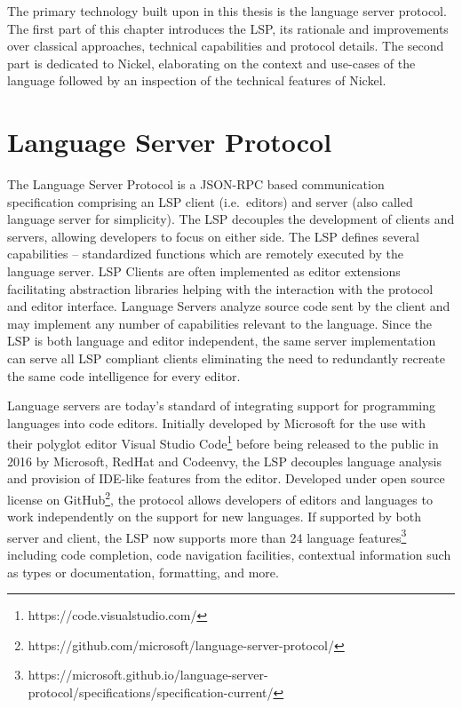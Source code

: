 \documentclass[
  a4paper,
  bibtex,
  english,
  nomenclature]{kthlatex/kththesis/kththesis}
\begin{document}
The primary technology built upon in this thesis is the language server
protocol. The first part of this chapter introduces the LSP, its
rationale and improvements over classical approaches, technical
capabilities and protocol details. The second part is dedicated to
Nickel, elaborating on the context and use-cases of the language
followed by an inspection of the technical features of Nickel.

\hypertarget{sec:language-server-protocol}{%
\section{Language Server Protocol}\label{sec:language-server-protocol}}

The Language Server Protocol is a JSON-RPC based communication
specification comprising an LSP client (i.e.~editors) and server (also
called language server for simplicity). The LSP decouples the
development of clients and servers, allowing developers to focus on
either side. The LSP defines several capabilities -- standardized
functions which are remotely executed by the language server. LSP
Clients are often implemented as editor extensions facilitating
abstraction libraries helping with the interaction with the protocol and
editor interface. Language Servers analyze source code sent by the
client and may implement any number of capabilities relevant to the
language. Since the LSP is both language and editor independent, the
same server implementation can serve all LSP compliant clients
eliminating the need to redundantly recreate the same code intelligence
for every editor.

Language servers are today's standard of integrating support for
programming languages into code editors. Initially developed by
Microsoft for the use with their polyglot editor Visual Studio
Code\footnote{https://code.visualstudio.com/} before being released to
the public in 2016 by Microsoft, RedHat and Codeenvy, the LSP decouples
language analysis and provision of IDE-like features from the editor.
Developed under open source license on GitHub\footnote{https://github.com/microsoft/language-server-protocol/},
the protocol allows developers of editors and languages to work
independently on the support for new languages. If supported by both
server and client, the LSP now supports more than 24 language
features\footnote{https://microsoft.github.io/language-server-protocol/specifications/specification-current/}
including code completion, code navigation facilities, contextual
information such as types or documentation, formatting, and more.
\end{document}
